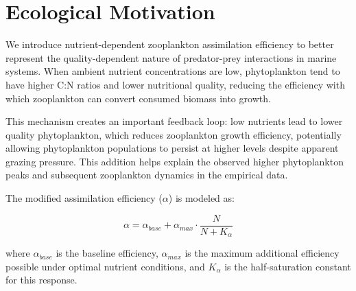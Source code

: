 \section{Ecological Motivation}

We introduce nutrient-dependent zooplankton assimilation efficiency to better represent the quality-dependent nature of predator-prey interactions in marine systems. When ambient nutrient concentrations are low, phytoplankton tend to have higher C:N ratios and lower nutritional quality, reducing the efficiency with which zooplankton can convert consumed biomass into growth.

This mechanism creates an important feedback loop: low nutrients lead to lower quality phytoplankton, which reduces zooplankton growth efficiency, potentially allowing phytoplankton populations to persist at higher levels despite apparent grazing pressure. This addition helps explain the observed higher phytoplankton peaks and subsequent zooplankton dynamics in the empirical data.

The modified assimilation efficiency ($\alpha$) is modeled as:

\[ \alpha = \alpha_{base} + \alpha_{max} \cdot \frac{N}{N + K_{\alpha}} \]

where $\alpha_{base}$ is the baseline efficiency, $\alpha_{max}$ is the maximum additional efficiency possible under optimal nutrient conditions, and $K_{\alpha}$ is the half-saturation constant for this response.
